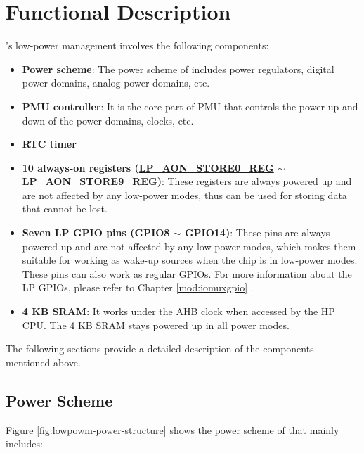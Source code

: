 \documentclass[main\_\_EN.tex]{subfiles}
\begin{document}
\section{Functional Description}

\chipname{}'s low-power management involves the following components:

\begin{itemize}
    \item \textbf{Power scheme}: The power scheme of \chipname{} includes power regulators, digital power domains, analog power domains, etc.

    \item \textbf{PMU controller}: It is the core part of PMU that controls the power up and down of the power domains, clocks, etc.

    \item \textbf{RTC timer}

    \item \textbf{10 always-on registers (\hyperref[regdesc:LPAONSTORENREG]{LP\_AON\_STORE0\_REG} $\sim$ \hyperref[regdesc:LPAONSTORENREG]{LP\_AON\_STORE9\_REG})}: These registers are always powered up and are not affected by any low-power modes, thus can be used for storing data that cannot be lost.

    \item \textbf{Seven LP GPIO pins (GPIO8 $\sim$ GPIO14)}: These pins are always powered up and are not affected by any low-power modes, which makes them suitable for working as wake-up sources when the chip is in low-power modes. These pins can also work as regular GPIOs. For more information about the LP GPIOs, please refer to Chapter \ref{mod:iomuxgpio} \textit{}.

    \item \textbf{4 KB SRAM}: It works under the AHB clock when accessed by the HP CPU. The 4 KB SRAM stays powered up in all power modes.

\end{itemize}

The following sections provide a detailed description of the components mentioned above.

\subsection{Power Scheme}

Figure \ref{fig:lowpowm-power-structure} shows the power scheme of \chipname{} that mainly includes:
\end{document}
